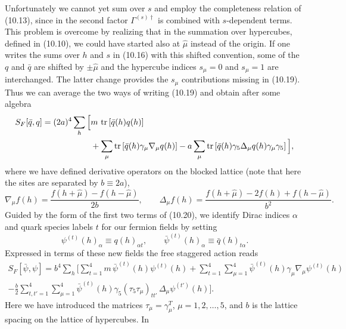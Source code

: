 Unfortunately we cannot yet sum over $s$ and employ the completeness relation
of (10.13), since in the second factor $\Gamma^{(s)\dagger}$ is combined with
$s$-dependent terms. This problem is overcome by realizing that in the
summation over hypercubes, defined in (10.10), we could have started also at
$\hat\mu$ instead of the origin. If one writes the sums over $h$ and $s$ in
(10.16) with this shifted convention, some of the $q$ and $\bar q$ are shifted
by $\pm\hat\mu$ and the hypercube indices $s_\mu = 0$ and $s_\mu = 1$ are
interchanged. The latter change provides the $s_\mu$ contributions missing in
(10.19). Thus we can average the two ways of writing (10.19) and obtain after
some algebra
\begin{equation}
  \begin{split}
    S_F[\bar q, q] = (2a)^4\sum_h \Big[
    & m\,\operatorname{tr}\left[\bar q(h)q(h)\right] \\
    &+ \sum_\mu \operatorname{tr}\left[\bar q(h)\gamma_\mu\nabla_\mu q(h)\right]
    - a\sum_\mu \operatorname{tr}\left[\bar q(h)\gamma_5\Delta_\mu q(h)\gamma_\mu\gamma_5\right]
    \Big] ,
  \end{split}
\end{equation}
where we have defined derivative operators on the blocked lattice (note that
here the sites are separated by $b \equiv 2a$),
\begin{equation}
  \nabla_\mu f(h) = \frac{f(h+\hat\mu) - f(h-\hat\mu)}{2b} , \qquad
  \Delta_\mu f(h) = \frac{f(h+\hat\mu) - 2f(h) + f(h-\hat\mu)}{b^2} .
\end{equation}
Guided by the form of the first two terms of (10.20), we identify Dirac
indices $\alpha$ and quark species labels $t$ for our fermion fields by
setting
\begin{equation}
  \psi^{(t)}(h)_\alpha \equiv q(h)_{\alpha t} , \qquad
  \bar\psi^{(t)}(h)_\alpha \equiv \bar q(h)_{t\alpha} .
\end{equation}
Expressed in terms of these new fields the free staggered action reads
\begin{multline}
  S_F[\bar\psi, \psi] = b^4 \sum_h \Bigg[
  \sum_{t=1}^{4} m\,\bar\psi^{(t)}(h)\psi^{(t)}(h)
  + \sum_{t=1}^{4}\sum_{\mu=1}^{4}
  \bar\psi^{(t)}(h)\gamma_\mu\nabla_\mu\psi^{(t)}(h) \\
  - \frac{b}{2} \sum_{t,t'=1}^{4}\sum_{\mu=1}^{4}
  \bar\psi^{(t)}(h)\gamma_5(\tau_5\tau_\mu)_{tt'}\,
  \Delta_\mu\psi^{(t')}(h) \Bigg] .
\end{multline}
Here we have introduced the matrices $\tau_\mu = \gamma_\mu^{T}$, $\mu = 1, 2,
\ldots, 5$, and $b$ is the lattice spacing on the lattice of hypercubes. In
